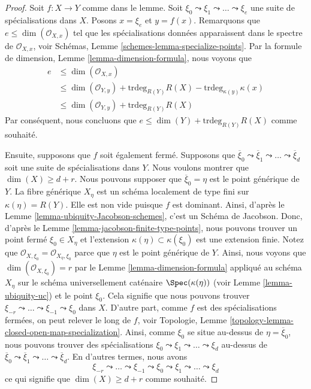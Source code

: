 \begin{proof}
Soit $f : X \to Y$ comme dans le
lemme. Soit $\xi_0 \leadsto \xi_1 \leadsto \ldots \leadsto \xi_e$ une suite de spécialisations
dans $X$. Posons $x = \xi_e$ et
$y = f(x)$. Remarquons que $e \leq \dim(\mathcal{O}_{X, x})$ tel que les
spécialisations données apparaissent dans
le spectre de $\mathcal{O}_{X, x}$, voir Schémas, Lemme \ref{schemes-lemma-specialize-points}. Par la
formule de dimension, Lemme \ref{lemma-dimension-formula}, nous voyons
que
\begin{align*}
e & \leq \dim(\mathcal{O}_{X, x}) \\
& \leq \dim(\mathcal{O}_{Y, y}) +
\text{trdeg}_{R(Y)} R(X) - \text{trdeg}_{\kappa(y)} \kappa(x) \\
& \leq \dim(\mathcal{O}_{Y, y}) + \text{trdeg}_{R(Y)} R(X)
\end{align*}
Par conséquent, nous concluons que $e \leq \dim(Y) + \text{trdeg}_{R(Y)} R(X)$ comme souhaité.

\medskip\noindent
Ensuite, supposons que $f$
soit également fermé. Supposons que $\overline{\xi}_0 \leadsto \overline{\xi}_1 \leadsto \ldots
\leadsto \overline{\xi}_d$ soit
une suite de spécialisations dans $Y$. Nous voulons montrer que $\dim(X) \geq d + r$. Nous pouvons
supposer que $\overline{\xi}_0 = \eta$ est le point générique de $Y$.
La fibre générique $X_\eta$ est un schéma localement de
type fini sur $\kappa(\eta) = R(Y)$. Elle est non vide puisque $f$
est dominant. Ainsi, d'après le Lemme \ref{lemma-ubiquity-Jacobson-schemes}, c'est
un Schéma de Jacobson. Donc, d'après le Lemme
\ref{lemma-jacobson-finite-type-points}, nous pouvons trouver un point fermé $\xi_0 \in X_\eta$
et l'extension $\kappa(\eta) \subset \kappa(\xi_0)$ est
une extension finie. Notez
que $\mathcal{O}_{X, \xi_0} = \mathcal{O}_{X_\eta, \xi_0}$ parce que $\eta$ est le point générique
de $Y$. Ainsi, nous voyons que
$\dim(\mathcal{O}_{X, \xi_0}) = r$ par le Lemme \ref{lemma-dimension-formula} appliqué au schéma $X_\eta$
sur le schéma universellement caténaire $\Spec(\kappa(\eta))$
(voir Lemme \ref{lemma-ubiquity-uc}) et le point $\xi_0$. Cela
signifie que nous pouvons trouver $\xi_{-r} \leadsto \ldots \leadsto \xi_{-1} \leadsto \xi_0$
dans $X$. D'autre part, comme $f$
est des spécialisations fermées, on peut relever
le long de $f$,
voir Topologie, Lemme \ref{topology-lemma-closed-open-map-specialization}. Ainsi, comme $\xi_0$
se situe
au-dessus de $\eta = \overline{\xi}_0$, nous pouvons trouver des spécialisations
$\xi_0 \leadsto \xi_1 \leadsto \ldots \leadsto \xi_d$ au-dessus de $\overline{\xi}_0 \leadsto \overline{\xi}_1 \leadsto \ldots
\leadsto \overline{\xi}_d$. En
d'autres termes, nous avons
$$
\xi_{-r} \leadsto \ldots \leadsto \xi_{-1} \leadsto \xi_0
\leadsto \xi_1 \leadsto \ldots \leadsto \xi_d
$$
ce qui signifie que $\dim(X) \geq d + r$ comme souhaité.
\end{proof}

